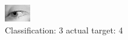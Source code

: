\begin{figure}[h!]
\begin{center}
\includegraphics[width=0.60\columnwidth]{figures/ID2954_class_3_target_4.png}
\end{center}
\caption{ Classification: 3 actual target: 4}
\label{fig:ID2954_class_3_target_4}
\end{figure}

